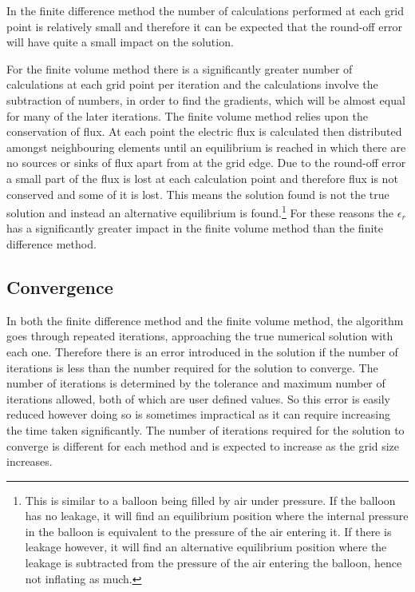 \documentclass[aps,twocolumn,pre,nofootinbib,10pt]{revtex4-1}
\begin{document}
In the finite difference method the number of calculations performed at each grid point is relatively small and therefore it can be expected that the round-off error will have quite a small impact on the solution. 

For the finite volume method there is a significantly greater number of calculations at each grid point per iteration and the calculations involve the subtraction of numbers, in order to find the gradients, which will be almost equal for many of the later iterations. The finite volume method relies upon the conservation of flux. At each point the electric flux is calculated then distributed amongst neighbouring elements until an equilibrium is reached in which there are no sources or sinks of flux apart from at the grid edge. Due to the round-off error a small part of the flux is lost at each calculation point and therefore flux is not conserved and some of it is lost. This means the solution found is not the true solution and instead an alternative equilibrium is found.\footnote{This is similar to a balloon being filled by air under pressure. If the balloon has no leakage, it will find an equilibrium position where the internal pressure in the balloon is equivalent to the pressure of the air entering it. If 
there is leakage however, it will find an alternative equilibrium position where the leakage is subtracted from the pressure of the air entering the balloon, hence not inflating as much.}  For these reasons the \(\epsilon_r\) has a significantly greater impact in the finite volume method than the finite difference method.


\subsection{Convergence}

In both the finite difference method and the finite volume method, the algorithm goes through repeated iterations, approaching the true numerical solution with each one. Therefore there is an error introduced in the solution if the number of iterations is less than the number required for the solution to converge. The number of iterations is determined by the tolerance and maximum number of iterations allowed, both of which are user defined values. So this error is easily reduced however doing so is sometimes impractical as it can require increasing the time taken significantly. The number of iterations required for the solution to converge is different for each method and is expected to increase as the grid size increases.
\end{document}
